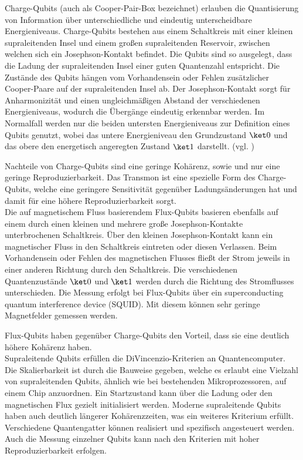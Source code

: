Charge-Qubits (auch als Cooper-Pair-Box bezeichnet) erlauben die Quantisierung von Information über unterschiedliche und eindeutig unterscheidbare Energieniveaus. Charge-Qubits bestehen aus einem Schaltkreis mit einer kleinen supraleitenden Insel und einem großen supraleitenden Reservoir, zwischen welchen sich ein Josephson-Kontakt befindet.
Die Qubits sind so ausgelegt, dass die Ladung der supraleitenden Insel einer guten Quantenzahl entspricht. Die Zustände des Qubits hängen vom Vorhandensein oder Fehlen zusätzlicher Cooper-Paare auf der supraleitenden Insel ab.
Der Josephson-Kontakt sorgt für Anharmonizität und einen ungleichmäßigen Abstand der verschiedenen Energieniveaus, wodurch die Übergänge eindeutig erkennbar werden. Im Normalfall werden nur die beiden untersten Energieniveaus zur Definition eines Qubits genutzt, wobei das untere Energieniveau den Grundzustand $\ket0$ und das obere den energetisch angeregten Zustand $\ket1$ darstellt. (vgl. \cite[Ch. 15.6]{bergou_quantum_2021})


Nachteile von Charge-Qubits sind eine geringe Kohärenz, sowie und nur eine geringe Reproduzierbarkeit. Das Transmon ist eine spezielle Form des Charge-Qubits, welche eine geringere Sensitivität gegenüber Ladungsänderungen hat und damit für eine höhere Reproduzierbarkeit sorgt.\\ 

Die auf magnetischem Fluss basierendem Flux-Qubits basieren ebenfalls auf einem durch einen kleinen und mehrere große Josephson-Kontakte unterbrochenen Schaltkreis.
Über den kleinen Josephson-Kontakt kann ein magnetischer Fluss in den Schaltkreis eintreten oder diesen Verlassen. Beim Vorhandensein oder Fehlen des magnetischen Flusses fließt der Strom jeweils in einer anderen Richtung durch den Schaltkreis. Die verschiedenen Quantenzustände $\ket0$ und $\ket1$ werden durch die Richtung des Stromflusses unterschieden. Die Messung erfolgt bei Flux-Qubits über ein superconducting quantum interference device (SQUID). Mit diesem können sehr geringe Magnetfelder gemessen werden.


Flux-Qubits haben gegenüber Charge-Qubits den Vorteil, dass sie eine deutlich höhere Kohärenz haben.\\

Supraleitende Qubits erfüllen die DiVincenzio-Kriterien an Quantencomputer. Die Skalierbarkeit ist durch die Bauweise gegeben, welche es erlaubt eine Vielzahl von supraleitenden Qubits, ähnlich wie bei bestehenden Mikroprozessoren, auf einem Chip anzuordnen. Ein Startzustand kann über die Ladung oder den magnetischen Flux gezielt initialisiert werden. Moderne supraleitende Qubits haben auch deutlich längerer Kohärenzzeiten, was ein weiteres Kriterium erfüllt. Verschiedene Quantengatter können realisiert und spezifisch angesteuert werden. Auch die Messung einzelner Qubits kann nach den Kriterien mit hoher Reproduzierbarkeit erfolgen.\\

